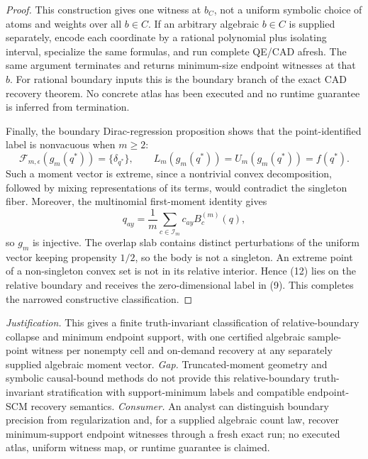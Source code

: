 \documentclass{article}
\begin{document}
\begin{proof}
This construction gives one witness at \(b_C\), not a uniform symbolic choice of atoms and weights over all \(b\in C\).  If an arbitrary algebraic \(b\in C\) is supplied separately, encode each coordinate by a rational polynomial plus isolating interval, specialize the same formulas, and run complete QE/CAD afresh.  The same argument terminates and returns minimum-size endpoint witnesses at that \(b\).  For rational boundary inputs this is the boundary branch of the exact CAD recovery theorem.  No concrete atlas has been executed and no runtime guarantee is inferred from termination.

Finally, the boundary Dirac-regression proposition shows that the point-identified label is nonvacuous when \(m\geq2\):
\[
 \mathcal F_{m,\epsilon}(g_m(q^*))=\{\delta_{q^*}\},
 \qquad L_m(g_m(q^*))=U_m(g_m(q^*))=f(q^*).
\tag{12}
\]
Such a moment vector is extreme, since a nontrivial convex decomposition, followed by mixing representations of its terms, would contradict the singleton fiber.  Moreover, the multinomial first-moment identity gives
\[
 q_{ay}=\frac1m\sum_{c\in\mathcal I_m}c_{ay}B_c^{(m)}(q),
\tag{13}
\]
so \(g_m\) is injective.  The overlap slab contains distinct perturbations of the uniform vector keeping propensity \(1/2\), so the body is not a singleton.  An extreme point of a non-singleton convex set is not in its relative interior.  Hence (12) lies on the relative boundary and receives the zero-dimensional label in (9).  This completes the narrowed constructive classification.
\end{proof}
\par\smallskip\noindent \textit{Justification.} This gives a finite truth-invariant classification of relative-boundary collapse and minimum endpoint support, with one certified algebraic sample-point witness per nonempty cell and on-demand recovery at any separately supplied algebraic moment vector. \textit{Gap.} Truncated-moment geometry and symbolic causal-bound methods do not provide this relative-boundary truth-invariant stratification with support-minimum labels and compatible endpoint-SCM recovery semantics. \textit{Consumer.} An analyst can distinguish boundary precision from regularization and, for a supplied algebraic count law, recover minimum-support endpoint witnesses through a fresh exact run; no executed atlas, uniform witness map, or runtime guarantee is claimed.
\end{document}
